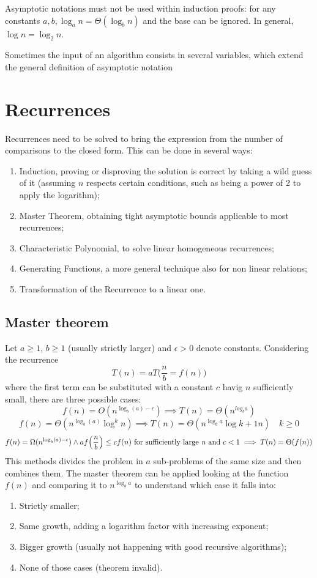 Asymptotic notations must not be used within induction proofs: for any constants $a, b, \log_a n = \Theta(\log_b n)$ and the base can be ignored. In general, $\log n = \log_2 n$.

Sometimes the input of an algorithm consists in several variables, which extend the general definition of asymptotic notation

\section{Recurrences}
Recurrences need to be solved to bring the expression from the number of comparisons to the closed form. This can be done in several ways:
\begin{enumerate}
	\item Induction, proving or disproving the solution is correct by taking a wild guess of it (assuming $n$ respects certain conditions, such as being a power of 2 to apply the logarithm);
	\item Master Theorem, obtaining tight asymptotic bounds applicable to most recurrences;
	\item Characteristic Polynomial, to solve linear homogeneous recurrences;
	\item Generating Functions, a more general technique also for non linear relations;
	\item Transformation of the Recurrence to a linear one.
\end{enumerate}

\subsection{Master theorem}
Let $a \geq 1$, $b \geq 1$ (usually strictly larger) and $\epsilon > 0$ denote constants. Considering the recurrence
$$T(n) = aT\Big( \frac{n}{b} = f(n) \Big)$$
where the first term can be substituted with a constant $c$ havig $n$ sufficiently small, there are three possible cases:
$$f(n) = O(n^{\log_b(a) - \epsilon}) \implies T(n) = \Theta(n^{log_ba})$$
$$f(n) = \Theta(n^{\log_b(a)}\log^kn) \implies T(n) = \Theta(n^{\log_ba}\log{k+1}n) \quad k \geq 0$$
$$f(n) = \Omega(n^{\log_b(a) - \epsilon}) \land af\Big( \frac{n}{b} \Big) \leq cf(n) \text{ for sufficiently large \textit{n} and $c < 1$} \implies T(n) = \Theta(f(n))$$ 
This methods divides the problem in $a$ sub-problems of the same size  and then combines them. The master theorem can be applied looking at the function $f(n)$ and comparing it to $n^{\log_ba}$ to understand which case it falls into:
\begin{enumerate}
	\item Strictly smaller;
	\item Same growth, adding a logarithm factor with increasing exponent;
	\item Bigger growth (usually not happening with good recursive algorithms);
	\item None of those cases (theorem invalid).
\end{enumerate}

